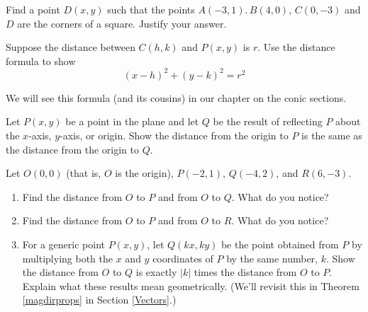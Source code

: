 \documentclass{ximera}
\begin{document}
\begin{problem}
Find a point $D(x, y)$ such that the points $A(-3, 1). \, B(4, 0), \, C(0, -3)$ and $D$ are the corners of a square.  Justify your answer.
\end{problem}

\begin{problem}
Suppose the distance between  $C(h,k)$ and $P(x,y)$ is $r$.  Use the distance formula to show \[(x-h)^2 + (y-k)^2 = r^2\]

We will see this formula (and its cousins) in our chapter on the conic sections.
\end{problem}

\begin{problem}
Let $P(x,y)$ be a point in the plane and let $Q$ be the result of reflecting $P$ about the $x$-axis, $y$-axis, or origin.  Show the distance from the origin to $P$ is the same as the distance from the origin to $Q$.  
\end{problem}

\begin{problem}\label{scalingdistance}
Let $O(0,0)$ (that is, $O$ is the origin),  $P(-2,1)$, $Q(-4,2)$, and $R(6,-3)$.  

\begin{enumerate}

\item  Find the distance from $O$ to $P$ and from $O$ to $Q$.  What do you notice?

\item  Find the distance from $O$ to $P$ and from $O$ to $R$.  What do you notice?

\item  For a generic point $P(x,y)$, let $Q(kx, ky)$ be the point obtained from $P$ by multiplying both the $x$ and $y$ coordinates of $P$ by the same number, $k$.  Show the distance from $O$ to $Q$ is exactly $|k|$ times the distance from $O$ to $P$.  Explain what these results mean geometrically. (We'll revisit this in Theorem \ref{magdirprops} in Section \ref{Vectors}.)

\end{enumerate}
\end{problem}
\end{document}
